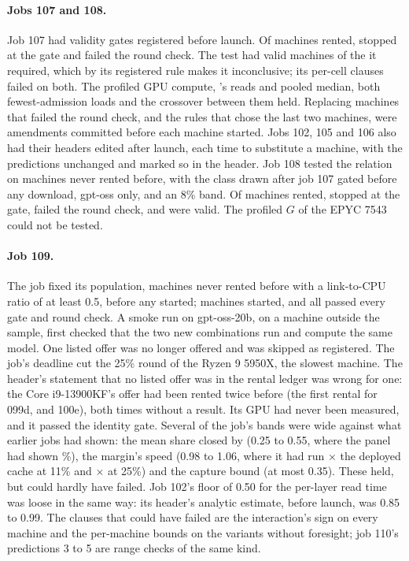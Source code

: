 \paragraph{Jobs 107 and 108.} Job 107 had validity gates registered before launch. Of \jlLaunched{} machines rented,
\jlGated{} stopped at the gate and \jlInvalid{} failed the round check. The test had \jlValidWord{} valid machines of
the \jlRequiredWord{} it required, which by its registered rule makes it inconclusive; its per-cell clauses failed on
both. The profiled GPU compute, \Margin{}'s reads and pooled median, both fewest-admission loads and the crossover
between them held. Replacing machines that failed the round check, and the rules that chose the last two machines,
were amendments committed before each machine started. Jobs 102, 105 and 106 also had their headers edited after
launch, each time to substitute a machine, with the predictions unchanged and marked so in the header. Job 108 tested
the relation on machines never rented before, with the class drawn after job 107 gated before any download, gpt-oss
only, and an 8\% band. Of \jmLaunched{} machines rented, \jmGated{} stopped at the gate, \jmInvalid{} failed the round
check, and \jmValidWord{} were valid. The profiled $G$ of the EPYC 7543 could not be tested.

\paragraph{Job 109.} The job fixed its population, machines never rented before with a link-to-CPU ratio of at least
0.5, before any started; \olStartedWord{} machines started, and all \olNWord{} passed every gate and round check. A
smoke run on gpt-oss-20b, on a machine outside the sample, first checked that the two new combinations run and compute
the same model. One listed offer was no longer offered and was skipped as registered. The job's deadline cut the 25\%
round of the Ryzen 9 5950X, the slowest machine. The header's statement that no listed offer was in the rental ledger
was wrong for one: the Core i9-13900KF's offer had been rented twice before (the first rental for 099d, and 100e),
both times without a result. Its GPU had never been measured, and it passed the identity gate. Several of the job's
bands were wide against what earlier jobs had shown: the mean share closed by \MinOne{} (0.25 to 0.55, where the panel
had shown \dmAllTogetherLow\%), the margin's speed (0.98 to 1.06, where it had run \rbDkLow$\times$ the deployed cache at 11\% and \rbDkMid$\times$ at 25\%) and the capture bound
(at most 0.35). These held, but could hardly have failed. Job 102's floor of 0.50 for the per-layer read time was
loose in the same way: its header's analytic estimate, before launch, was 0.85 to 0.99. The clauses that could have failed are the interaction's sign
on every machine and the per-machine bounds on the variants without foresight; job 110's predictions 3 to 5 are
range checks of the same kind.

